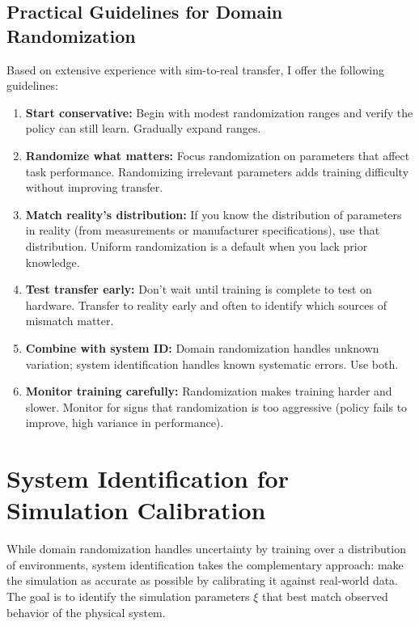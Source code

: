 \subsection{Practical Guidelines for Domain Randomization}

Based on extensive experience with sim-to-real transfer, I offer the following guidelines:

\begin{enumerate}
    \item \textbf{Start conservative:} Begin with modest randomization ranges and verify the policy can still learn. Gradually expand ranges.

    \item \textbf{Randomize what matters:} Focus randomization on parameters that affect task performance. Randomizing irrelevant parameters adds training difficulty without improving transfer.

    \item \textbf{Match reality's distribution:} If you know the distribution of parameters in reality (from measurements or manufacturer specifications), use that distribution. Uniform randomization is a default when you lack prior knowledge.

    \item \textbf{Test transfer early:} Don't wait until training is complete to test on hardware. Transfer to reality early and often to identify which sources of mismatch matter.

    \item \textbf{Combine with system ID:} Domain randomization handles unknown variation; system identification handles known systematic errors. Use both.

    \item \textbf{Monitor training carefully:} Randomization makes training harder and slower. Monitor for signs that randomization is too aggressive (policy fails to improve, high variance in performance).
\end{enumerate}

\section{System Identification for Simulation Calibration}
\label{sec:system_identification}

While domain randomization handles uncertainty by training over a distribution of environments, system identification takes the complementary approach: make the simulation as accurate as possible by calibrating it against real-world data. The goal is to identify the simulation parameters $\xi$ that best match observed behavior of the physical system.


